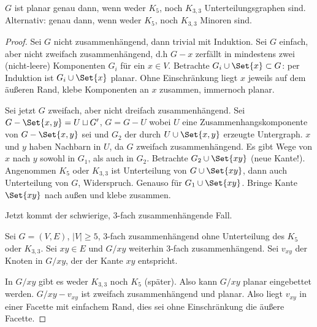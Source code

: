 \begin{st}[Kuratowski, 1930]
    $G$ ist planar genau dann, wenn weder $K_5$, noch $K_{3,3}$ Unterteilungsgraphen sind.
    Alternativ: genau dann, wenn weder $K_5$, noch $K_{3,3}$ Minoren sind.
    \begin{proof}
        Sei $G$ nicht zusammenhängend, dann trivial mit Induktion.
        Sei $G$ einfach, aber nicht zweifach zusammenhängend, d.h $G - x$ zerfällt in mindestens zwei (nicht-leere) Komponenten $G_i$ für ein $x \in V$.
        Betrachte $G_i \cup \Set{x} \subset G$: per Induktion ist $G_i \cup \Set{x}$ planar.
        Ohne Einschränkung liegt $x$ jeweils auf dem äußeren Rand, klebe Komponenten an $x$ zusammen, immernoch planar.

        Sei jetzt $G$ zweifach, aber nicht dreifach zusammenhängend.
        Sei $G - \Set{x,y} = U \sqcup G'$, $G = G - U$ wobei $U$ eine Zusammenhangskomponente von $G - \Set{x,y}$ sei und $G_2$ der durch $U \cup \Set{x,y}$ erzeugte Untergraph.
        $x$ und $y$ haben Nachbarn in $U$, da $G$ zweifach zusammenhängend.
        Es gibt Wege von $x$ nach $y$ sowohl in $G_1$, als auch in $G_2$.
        Betrachte $G_2 \cup \Set{xy}$ (neue Kante!).
        Angenommen $K_5$ oder $K_{3,3}$ ist Unterteilung von $G \cup \Set{xy}$, dann auch Unterteilung von $G$, Widerspruch.
        Genauso für $G_1 \cup \Set{xy}$.
        Bringe Kante $\Set{xy}$ nach außen und klebe zusammen.

        Jetzt kommt der schwierige, 3-fach zusammenhängende Fall.

        Sei $G = (V, E)$, $|V| \ge 5$, 3-fach zusammenhängend ohne Unterteilung des $K_5$ oder $K_{3,3}$.
        Sei $xy \in E$ und $G / xy$ weiterhin 3-fach zusammenhängend.
        Sei $v_{xy}$ der Knoten in $G / xy$, der der Kante $xy$ entspricht.

        In $G / xy$ gibt es weder $K_{3,3}$ noch $K_5$ (später).
        Also kann $G / xy$ planar eingebettet werden.
        $G / xy - v_{xy}$ ist zweifach zusammenhängend und planar.
        Also liegt $v_{xy}$ in einer Facette mit einfachem Rand, dies sei ohne Einschränkung die äußere Facette.



\end{proof}
\end{st}
